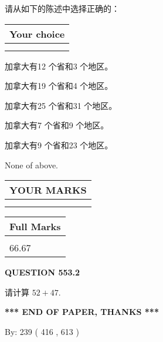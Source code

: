 \documentclass{ctexart}
\begin{document}
  
请从如下的陈述中选择正确的：
  
  
\noindent\hspace{3.0in} \begin{tabular}{|l|}
\hline
Your choice \\
\hline
 \\ 
 \\ 
\hline
\end{tabular}
  
  
 
 
加拿大有12 个省和3 个地区。
 
 
加拿大有19 个省和4 个地区。
 
 
加拿大有25 个省和31 个地区。
 
 
加拿大有7 个省和9 个地区。
 
 
加拿大有9 个省和23 个地区。
 
 
 None of above.
 
 
  
\vspace{0.2in}
  
\noindent\begin{tabular}{|l|}
\hline
 YOUR MARKS  \\
\hline
 \\ 
 \\ 
\hline
\end{tabular}
\hspace{0.05in} \begin{tabular}{|l|}
\hline
 Full Marks  \\
\hline
 \\ 
66.67 \\
\hline
\end{tabular}
{\textbf{\Large{QUESTION
553.2 
}}}
  
  
 
请计算 $ %
52 +  %
47 $.
 

 

 
   
   
 \vspace{0.2in}
 
   
   
   
   
\vspace{1.0in} 
{\textbf{\large{ *** END OF PAPER, THANKS *** }}} 
   
   
\hspace{1.0in} By: 
 239 ( 416 ,  613 )
   
\end{document}
